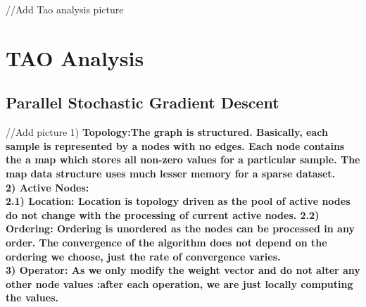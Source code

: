 \documentclass{sigplanconf}
\begin{document}
//Add Tao analysis picture
\section{TAO Analysis}
\subsection{Parallel Stochastic Gradient Descent}
//Add picture
1) \bf{Topology}:\rm The graph is structured. Basically, each sample is represented by a nodes with no edges. Each node contains the
a map which stores all non-zero values for a particular sample. The map data structure uses much lesser memory for a sparse dataset. \\
2) \bf{Active Nodes}:\\\rm
2.1) \bf{Location}: \rm Location is topology driven as the pool of active nodes do not change with the
processing of current active nodes.
2.2) \bf{Ordering}: \rm Ordering is unordered as the nodes can be processed in any order. The convergence of the algorithm does not depend on the ordering we choose, just the rate of convergence varies.\\
3) \bf{Operator}: \rm As we only modify the weight vector and do not alter any other node values :after each operation, we are just
locally computing the values.

\rm
\end{document}
